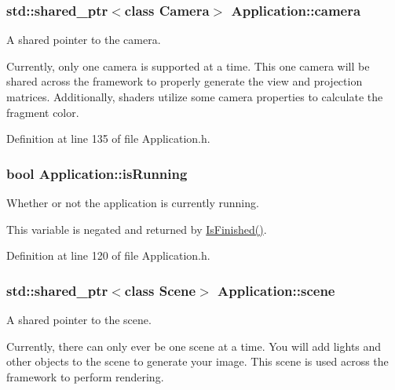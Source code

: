 \subsubsection[{camera}]{\setlength{\rightskip}{0pt plus 5cm}std\+::shared\+\_\+ptr$<$class {\bf Camera}$>$ Application\+::camera\hspace{0.3cm}{\ttfamily [protected]}}\label{class_application_a0e8589fcb13c520ba472473abe5a518d}


A shared pointer to the camera. 

Currently, only one camera is supported at a time. This one camera will be shared across the framework to properly generate the view and projection matrices. Additionally, shaders utilize some camera properties to calculate the fragment color. 

Definition at line 135 of file Application.\+h.

\hypertarget{class_application_ae1c1ff7a7663d9baa9b65a7ba8e1dcf8}{}
\subsubsection[{is\+Running}]{\setlength{\rightskip}{0pt plus 5cm}bool Application\+::is\+Running\hspace{0.3cm}{\ttfamily [protected]}}\label{class_application_ae1c1ff7a7663d9baa9b65a7ba8e1dcf8}


Whether or not the application is currently running. 

This variable is negated and returned by \hyperlink{class_application_ae0019f2c58008791971e67f23f2d4182}{Is\+Finished()}. 

Definition at line 120 of file Application.\+h.

\hypertarget{class_application_a88c6615107a5094bb93fa5f153f79554}{}
\subsubsection[{scene}]{\setlength{\rightskip}{0pt plus 5cm}std\+::shared\+\_\+ptr$<$class {\bf Scene}$>$ Application\+::scene\hspace{0.3cm}{\ttfamily [protected]}}\label{class_application_a88c6615107a5094bb93fa5f153f79554}


A shared pointer to the scene. 

Currently, there can only ever be one scene at a time. You will add lights and other objects to the scene to generate your image. This scene is used across the framework to perform rendering. 

